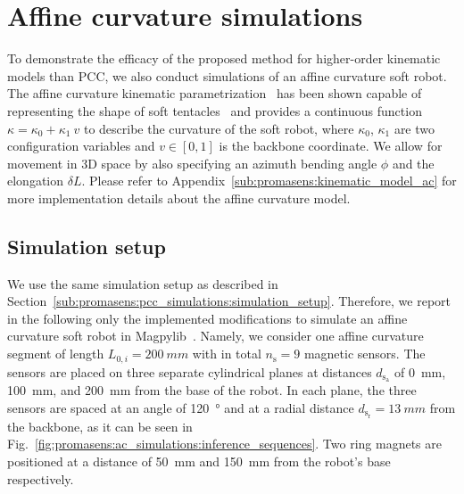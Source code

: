 \section{Affine curvature simulations}\label{sec:promasens:ac_simulations}
To demonstrate the efficacy of the proposed method for higher-order kinematic models than \gls{PCC}, we also conduct simulations of an affine curvature soft robot.
The affine curvature kinematic parametrization~\cite{della2020soft} has been shown capable of representing the shape of soft tentacles~\cite{stella2022experimental, stella2023piecewise} and provides a continuous function $\kappa = \kappa_0 + \kappa_1 \: v$ to describe the curvature of the soft robot, where $\kappa_0$, $\kappa_1$ are two configuration variables and $v \in [0, 1]$ is the backbone coordinate. We allow for movement in 3D space by also specifying an azimuth bending angle $\phi$ and the elongation $\delta L$.
Please refer to Appendix~\ref{sub:promasens:kinematic_model_ac} for more implementation details about the affine curvature model.


\subsection{Simulation setup}\label{sub:promasens:ac_simulations:simulation_setup}
We use the same simulation setup as described in Section~\ref{sub:promasens:pcc_simulations:simulation_setup}. 
Therefore, we report in the following only the implemented modifications to simulate an affine curvature soft robot in Magpylib~\cite{magpylib2020}.
Namely, we consider one affine curvature segment of length $L_{0,i} = \SI{200}{mm}$ with in total $n_\mathrm{s} = 9$ magnetic sensors. 
The sensors are placed on three separate cylindrical planes at distances $d_{\mathrm{s}_\mathrm{a}}$ of \SI{0}{mm}, \SI{100}{mm}, and \SI{200}{mm} from the base of the robot. In each plane, the three sensors are spaced at an angle of \SI{120}{\degree} and at a radial distance $d_{\mathrm{s}_\mathrm{r}} = \SI{13}{mm}$ from the backbone, as it can be seen in Fig.~\ref{fig:promasens:ac_simulations:inference_sequences}.
Two ring magnets are positioned at a distance of \SI{50}{mm} and \SI{150}{mm} from the robot's base respectively.

